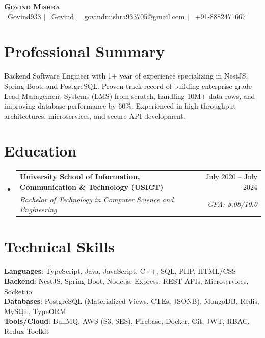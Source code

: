 \documentclass[letterpaper,11pt]{article}
\makeatletter
\newcommand{\resumeSubheading}[4]{
  \vspace{-2pt}\item
    \begin{tabular*}{0.97\textwidth}[t]{l@{\extracolsep{\fill}}r}
      \textbf{#1} & #2 \\
      \textit{\small#3} & \textit{\small #4} \\
    \end{tabular*}\vspace{-7pt}
}
\newcommand{\resumeSubHeadingListStart}{\begin{itemize}[leftmargin=0.15in, label={}]}
\newcommand{\resumeSubHeadingListEnd}{\end{itemize}}
\makeatother
\begin{document}
\begin{center}
    \textbf{\Huge \scshape Govind Mishra} \\ \vspace{1pt}
    \small
    \faGithub\ \href{https://github.com/Govind933}{\underline{Govind933}} $|$
    \faLinkedin\ \href{https://linkedin.com/in/Govind}{\underline{Govind}} $|$
    \faEnvelope\ \href{mailto:govindmishra933705@gmail.com}{\underline{govindmishra933705@gmail.com}} $|$
    \faPhone\ +91-8882471667
\end{center}

\section{Professional Summary}
Backend Software Engineer with 1+ year of experience specializing in NestJS, Spring Boot, and PostgreSQL. Proven track record of building enterprise-grade Lead Management Systems (LMS) from scratch, handling 10M+ data rows, and improving database performance by 60\%. Experienced in high-throughput architectures, microservices, and secure API development.

\section{Education}
  \resumeSubHeadingListStart
    \resumeSubheading
      {University School of Information, Communication \& Technology (USICT)}{July 2020 -- July 2024}
      {Bachelor of Technology in Computer Science and Engineering}{GPA: 8.08/10.0}
  \resumeSubHeadingListEnd

\section{Technical Skills}
 \begin{itemize}[leftmargin=0.15in, label={}]
    \small{\item{
     \textbf{Languages}{: TypeScript, Java, JavaScript, C++, SQL, PHP, HTML/CSS} \\
     \textbf{Backend}{: NestJS, Spring Boot, Node.js, Express, REST APIs, Microservices, Socket.io} \\
     \textbf{Databases}{: PostgreSQL (Materialized Views, CTEs, JSONB), MongoDB, Redis, MySQL, TypeORM} \\
     \textbf{Tools/Cloud}{: BullMQ, AWS (S3, SES), Firebase, Docker, Git, JWT, RBAC, Redux Toolkit}
    }}
 \end{itemize}
\end{document}
